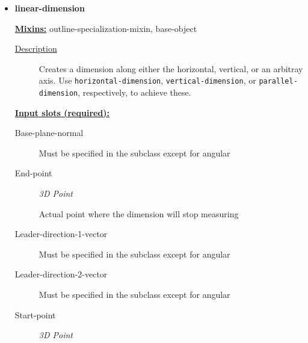\documentclass [11pt]{book}
\begin{document}
\begin{itemize}
\item {}
\label{prim:linear-dimension}
\textbf{linear-dimension}


\textbf{
\underline{Mixins:}} outline-specialization-mixin, base-object





\begin{description}

\item [
\underline{Description}]


Creates a dimension along either the
horizontal, vertical, or an arbitray axis. Use
\texttt{horizontal-dimension}, \texttt{vertical-dimension}, or
\texttt{parallel-dimension}, respectively, to achieve these.



\end{description}








\textbf{
\underline{Input slots (required):}}

\begin{description}

\item [Base-plane-normal]

Must be specified in the subclass except for angular




\item [End-point]
\emph{3D Point}

 Actual point where the dimension will stop measuring




\item [Leader-direction-1-vector]

Must be specified in the subclass except for angular




\item [Leader-direction-2-vector]

Must be specified in the subclass except for angular




\item [Start-point]
\emph{3D Point}


\end{description}
\end{itemize}
\end{document}
